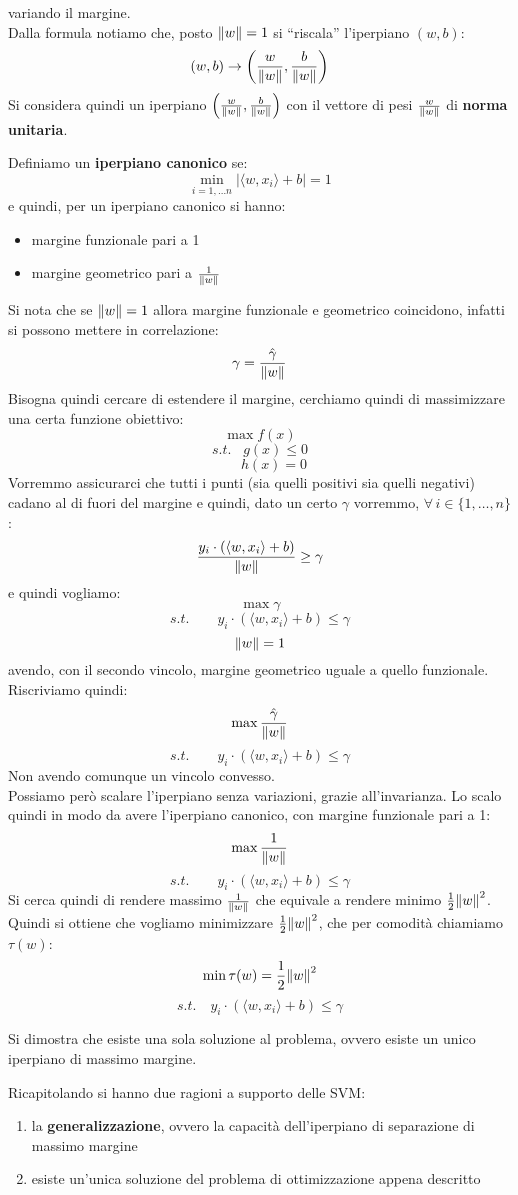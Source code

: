 variando il margine.\\
Dalla formula notiamo che, posto $\norm{w}=1$ si ``riscala'' l'iperpiano $(w,b)$:
\[(w,b)\to\left(\frac{w}{\norm{w}},\frac{b}{\norm{w}}\right)\]
Si considera quindi un iperpiano
$\left(\frac{w}{\norm{w}},\frac{b}{\norm{w}}\right)$ con il vettore di pesi
$\frac{w}{\norm{w}}$ di \textbf{norma unitaria}.
\begin{definizione}
  Definiamo un \textbf{iperpiano canonico} se:
  \[\min_{i=1,\ldots n}|\langle w,x_i\rangle+b|=1\]
  e quindi, per un iperpiano canonico si hanno:
  \begin{itemize}
    \item margine funzionale pari a 1
    \item margine geometrico pari a $\frac{1}{\norm{w}}$
  \end{itemize}
\end{definizione}
Si nota che se $\norm{w}=1$ allora margine funzionale e geometrico coincidono,
infatti si possono mettere in correlazione:
\[\gamma=\frac{\hat{\gamma}}{\norm{w}}\]
Bisogna quindi cercare di estendere il margine, cerchiamo quindi di
massimizzare una certa funzione obiettivo:
\[\max f(x)\]
\[s.t.\,\,\,\,\,g(x)\leq 0\]
\[\qquad h(x)=0\]
Vorremmo assicurarci che tutti i punti (sia quelli positivi sia quelli negativi)
cadano  al di fuori del margine e quindi, dato un certo $\gamma$ vorremmo,
$\forall\,i\in\{1,\ldots,n\}$:
\[\frac{y_i\cdot(\langle w,x_i\rangle+b)}{\norm{w}}\geq \gamma\]
e quindi vogliamo:
\[\max \gamma\]
\[s.t.\qquad y_i\cdot(\langle w,x_i\rangle+b)\leq \gamma\]
\[\norm{w}=1 \]
avendo, con il secondo vincolo,  margine geometrico uguale a quello
funzionale.\\
Riscriviamo quindi:
\[\max \frac{\hat{\gamma}}{\norm{w}}\]
\[s.t.\qquad y_i\cdot(\langle w,x_i\rangle+b)\leq \gamma\]
Non avendo comunque un vincolo convesso.\\
Possiamo però scalare l'iperpiano senza variazioni, grazie all'invarianza. Lo
scalo quindi in modo da avere l'iperpiano canonico, con margine funzionale pari
a 1:
\[\max \frac{1}{\norm{w}}\]
\[s.t.\qquad y_i\cdot(\langle w,x_i\rangle+b)\leq \gamma\]
Si cerca quindi di rendere massimo $\frac{1}{\norm{w}}$ che equivale a rendere
minimo $\frac{1}{2}\norm{w}^2$. Quindi si ottiene che vogliamo minimizzare
$\frac{1}{2}\norm{w}^2$, che per comodità chiamiamo $\tau(w)$:
\[\min \tau(w)=\frac{1}{2}\norm{w}^2\]
\[s.t.\quad y_i\cdot(\langle w,x_i\rangle+b)\leq \gamma\]
\begin{teorema}
  Si dimostra che esiste una sola soluzione al problema, ovvero esiste un unico
  iperpiano di massimo margine.
\end{teorema}
Ricapitolando si hanno due ragioni a supporto delle SVM:
\begin{enumerate}
  \item la \textbf{generalizzazione}, ovvero la capacità dell'iperpiano di
  separazione di massimo margine
  \item esiste un’unica soluzione del problema di ottimizzazione appena
  descritto 
\end{enumerate}


